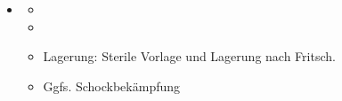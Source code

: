 \label{m:placenta-praevia}
\begin{itemize}
    \item \TxMassVitMKBes
    \begin{itemize}
      \item {}
      \item {}
        \item Lagerung: Sterile Vorlage und Lagerung nach
        Fritsch.
        \item Ggfs. Schockbekämpfung
    \end{itemize}
\end{itemize} \autocite{MA70-Protokoll-2012-10-11}